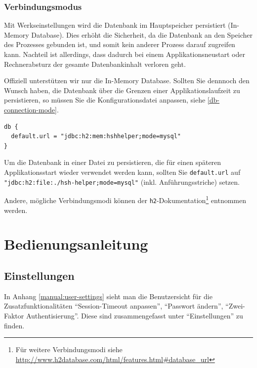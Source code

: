 \documentclass[12pt,DIV14,BCOR10mm,a4paper,parskip=half-,headsepline,headinclude,english,ngerman,bibliography=totocnumbered]{scrreprt}
\begin{document}
\subsection{Verbindungsmodus}

Mit Werkseinstellungen wird die Datenbank im Hauptspeicher persistiert (In-Memory Database).
Dies erhöht die Sicherheit, da die Datenbank an den Speicher des Prozesses gebunden ist, und somit kein anderer Prozess darauf zugreifen kann.
Nachteil ist allerdings, dass dadurch bei einem Applikationsneustart oder Rechnerabsturz der gesamte Datenbankinhalt verloren geht.

Offiziell unterstützen wir nur die In-Memory Database.
Sollten Sie dennnoch den Wunsch haben, die Datenbank über die Grenzen einer Applikationslaufzeit zu persistieren, so müssen Sie die Konfigurationsdatei anpassen, siehe \ref{db-connection-mode}.

\begin{lstlisting}[label=db-connection-mode, caption={Einstellung innerhalb der Konfigurationsdatei zum Anpassen des Verbindungsmodus der verwendeten Datenbank},captionpos=b]
db {
  default.url = "jdbc:h2:mem:hshhelper;mode=mysql"
}
\end{lstlisting}

\begin{sloppypar}
Um die Datenbank in einer Datei zu persistieren, die für einen späteren Applikationsstart wieder verwendet werden kann, sollten Sie \texttt{default.url} auf \texttt{"jdbc:h2:file:./hsh-helper;mode=mysql"} (inkl. Anführungsstriche) setzen.
\end{sloppypar}
Andere, mögliche Verbindungsmodi können der \texttt{h2}-Dokumentation\footnote{Für weitere Verbindungsmodi siehe \url{http://www.h2database.com/html/features.html\#database\_url}} entnommen werden.

\chapter{Bedienungsanleitung}

\section{Einstellungen}

In Anhang \autoref{manual:user-settings} sieht man die Benutzersicht für die Zusatzfunktionalitäten \enquote{Session-Timeout anpassen}, \enquote{Passwort ändern}, \enquote{Zwei-Faktor Authentisierung}.
Diese sind zusammengefasst unter \enquote{Einstellungen} zu finden.
\end{document}
